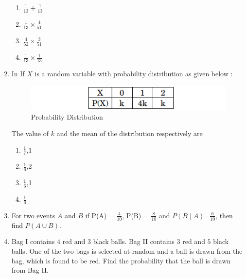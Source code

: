\begin{enumerate}[label=\thesection.\arabic*.,ref=\thesection.\theenumi]
\begin{enumerate}[label=(\alph*)]
    
 \item $\frac{1}{13} + \frac{1}{13}$
 
 \item $\frac{1}{13} \times \frac{4}{51}$

 \item $\frac{4}{52} \times \frac{3}{51}$
 
 \item $\frac{1}{13} \times \frac{1}{13}$ 

\end{enumerate}

\item In  If $X$ is a random variable with probability distribution as given 
below :
\begin{figure}[H]
        \centering
        \includegraphics[width=\columnwidth]{./figs/Screenshot (32).png}
        \caption{Probability Distribution}
        \label{fig:fig5.png}
    \end{figure}

The value of $k$ and the mean of the distribution respectively 
are

 \begin{enumerate}[label=(\alph*)]
    
 \item  $\frac{1}{7}$,1 
 
 \item  $\frac{1}{6}$,2

 \item  $\frac{1}{6}$,1

 \item  $\frac{1}{6}$

\end{enumerate}


\item For two events $A$ and $B$ if P(A) = $\frac{4}{10}$, P(B) = $\frac{8}{10}$ and 
$ P(B \mid A)$=$\frac{6}{10}$, then find $ P(A \cup B)$.

\item Bag I contains $4$ red and $3$ black balls. Bag II contains $3$ red 
and $5$ black balls. One of the two bags is selected at random 
and a ball is drawn from the bag, which is found to be red. 
Find the probability that the ball is drawn from Bag II.


\end{enumerate}
